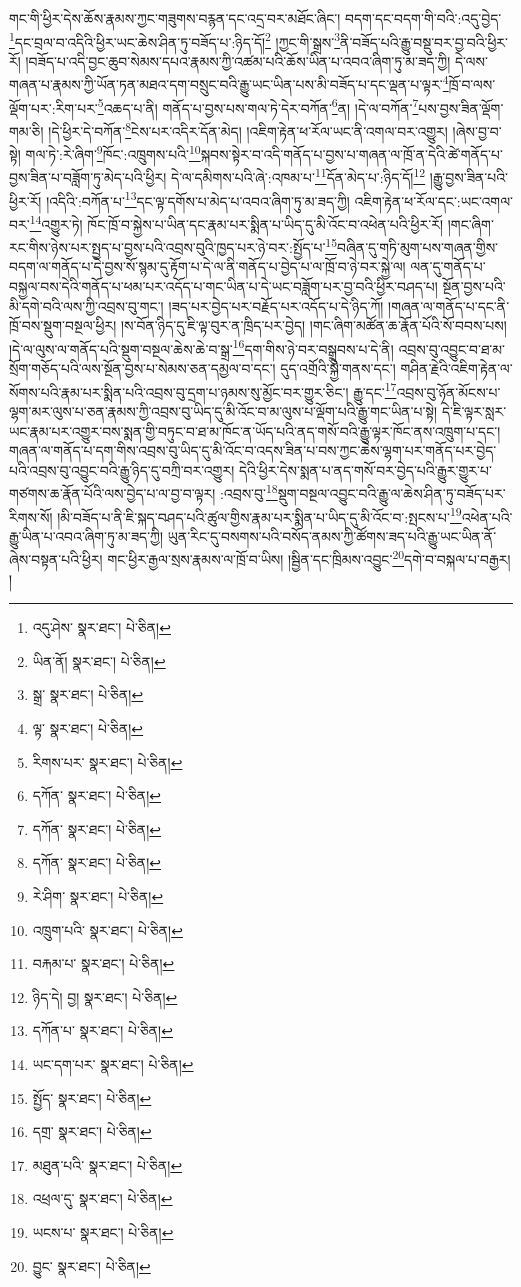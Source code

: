 གང་གི་ཕྱིར་དེས་ཆོས་རྣམས་ཀྱང་གཟུགས་བརྙན་དང་འདྲ་བར་མཐོང་ཞིང་། བདག་དང་བདག་གི་བའི་:འདུ་བྱེད་\footnote{འདུ་ཤེས་  སྣར་ཐང་།  པེ་ཅིན། }དང་བྲལ་བ་འདིའི་ཕྱིར་ཡང་ཆེས་ཤིན་ཏུ་བཟོད་པ་:ཉིད་དོ།\footnote{ཡིན་ནོ།  སྣར་ཐང་།  པེ་ཅིན། } །ཀྱང་གི་སྒྲས་\footnote{སྒྲ་  སྣར་ཐང་།  པེ་ཅིན། }ནི་བཟོད་པའི་རྒྱུ་བསྡུ་བར་བྱ་བའི་ཕྱིར་རོ། །བཟོད་པ་འདི་བྱང་ཆུབ་སེམས་དཔའ་རྣམས་ཀྱི་འཚམ་པའི་ཆོས་ཡིན་པ་འབའ་ཞིག་ཏུ་མ་ཟད་ཀྱི། དེ་ལས་གཞན་པ་རྣམས་ཀྱི་ཡོན་ཏན་མཐའ་དག་བསྲུང་བའི་རྒྱུ་ཡང་ཡིན་པས་མི་བཟོད་པ་དང་ལྡན་པ་ལྟར་\footnote{ལྟ་  སྣར་ཐང་།  པེ་ཅིན། }ཁྲོ་བ་ལས་ལྡོག་པར་:རིག་པར་\footnote{རིགས་པར་  སྣར་ཐང་།  པེ་ཅིན། }འཆད་པ་ནི། གནོད་པ་བྱས་པས་གལ་ཏེ་དེར་བཀོན་\footnote{དཀོན་  སྣར་ཐང་།  པེ་ཅིན། }ན། །དེ་ལ་བཀོན་\footnote{དཀོན་  སྣར་ཐང་།  པེ་ཅིན། }པས་བྱས་ཟིན་ལྡོག་གམ་ཅི། །དེ་ཕྱིར་དེ་བཀོན་\footnote{དཀོན་  སྣར་ཐང་།  པེ་ཅིན། }ངེས་པར་འདིར་དོན་མེད། །འཇིག་རྟེན་ཕ་རོལ་ཡང་ནི་འགལ་བར་འགྱུར། །ཞེས་བྱ་བ་སྟེ། གལ་ཏེ་:རེ་ཞིག་\footnote{རེ་ཤིག་  སྣར་ཐང་།  པེ་ཅིན། }ཁོང་:འཁྲུགས་པའི་\footnote{འཁྲུག་པའི་  སྣར་ཐང་།  པེ་ཅིན། }སྐབས་སྟེར་བ་འདི་གནོད་པ་བྱས་པ་གཞན་ལ་ཁྲོ་ན་དེའི་ཚེ་གནོད་པ་བྱས་ཟིན་པ་བཟློག་ཏུ་མེད་པའི་ཕྱིར། དེ་ལ་དམིགས་པའི་ཞེ་:འཁམ་པ་\footnote{བརྐམ་པ་  སྣར་ཐང་།  པེ་ཅིན། }དོན་མེད་པ་:ཉིད་དོ།\footnote{ཉིད་དེ། བྱ།  སྣར་ཐང་།  པེ་ཅིན། } །རྒྱུ་བྱས་ཟིན་པའི་ཕྱིར་རོ། །འདིའི་:བཀོན་པ་\footnote{དཀོན་པ་  སྣར་ཐང་།  པེ་ཅིན། }དང་ལྟ་དགོས་པ་མེད་པ་འབའ་ཞིག་ཏུ་མ་ཟད་ཀྱི། འཇིག་རྟེན་ཕ་རོལ་དང་:ཡང་འགལ་བར་\footnote{ཡང་དག་པར་  སྣར་ཐང་།  པེ་ཅིན། }འགྱུར་ཏེ། ཁོང་ཁྲོ་བ་སྐྱེས་པ་ཡིན་དང་རྣམ་པར་སྨིན་པ་ཡིད་དུ་མི་འོང་བ་འཕེན་པའི་ཕྱིར་རོ། །གང་ཞིག་རང་གིས་ཉེས་པར་སྤྱད་པ་བྱས་པའི་འབྲས་བུའི་ཁྱད་པར་ཉེ་བར་:སྤྱོད་པ་\footnote{སྤྱོད་  སྣར་ཐང་།  པེ་ཅིན། }བཞིན་དུ་གཏི་མུག་པས་གཞན་གྱིས་བདག་ལ་གནོད་པ་དེ་བྱས་སོ་སྙམ་དུ་རྟོག་པ་དེ་ལ་ནི་གནོད་པ་བྱེད་པ་ལ་ཁྲོ་བ་ཉེ་བར་སྐྱེ་ལ། ལན་དུ་གནོད་པ་བསྐྱལ་བས་དེའི་གནོད་པ་ཕམ་པར་འདོད་པ་གང་ཡིན་པ་དེ་ཡང་བཟློག་པར་བྱ་བའི་ཕྱིར་བཤད་པ། སྔོན་བྱས་པའི་མི་དགེ་བའི་ལས་ཀྱི་འབྲས་བུ་གང་། །ཟད་པར་བྱེད་པར་བརྗོད་པར་འདོད་པ་དེ་ཉིད་ཀོ། །གཞན་ལ་གནོད་པ་དང་ནི་ཁྲོ་བས་སྡུག་བསྔལ་ཕྱིར། །ས་བོན་ཉིད་དུ་ཇི་ལྟ་བུར་ན་ཁྲིད་པར་བྱེད། །གང་ཞིག་མཚོན་ཆ་རྣོན་པོའི་སོ་བབས་པས། །དེ་ལ་ལུས་ལ་གནོད་པའི་སྡུག་བསྔལ་ཆེས་ཆེ་བ་སྒྲ་\footnote{དགྲ་  སྣར་ཐང་།  པེ་ཅིན། }དག་གིས་ཉེ་བར་བསྒྲུབས་པ་དེ་ནི། འབྲས་བུ་འབྱུང་བ་ཐ་མ་སྲོག་གཅོད་པའི་ལས་སྔོན་བྱས་པ་སེམས་ཅན་དམྱལ་བ་དང་། དུད་འགྲོའི་སྐྱེ་གནས་དང་། གཤིན་རྗེའི་འཇིག་རྟེན་ལ་སོགས་པའི་རྣམ་པར་སྨིན་པའི་འབྲས་བུ་དྲག་པ་ཉམས་སུ་མྱོང་བར་གྱུར་ཅིང་། རྒྱུ་དང་\footnote{མཐུན་པའི་  སྣར་ཐང་།  པེ་ཅིན། }འབྲས་བུ་ཉོན་མོངས་པ་ལྷག་མར་ལུས་པ་ཅན་རྣམས་ཀྱི་འབྲས་བུ་ཡིད་དུ་མི་འོང་བ་མ་ལུས་པ་ལྡོག་པའི་རྒྱུ་གང་ཡིན་པ་སྟེ། དེ་ཇི་ལྟར་སླར་ཡང་རྣམ་པར་འགྱུར་བས་སྨན་གྱི་བཏུང་བ་ཐ་མ་ཁོང་ན་ཡོད་པའི་ནད་གསོ་བའི་རྒྱུ་ལྟར་ཁོང་ནས་འཁྲུག་པ་དང་། གཞན་ལ་གནོད་པ་དག་གིས་འབྲས་བུ་ཡིད་དུ་མི་འོང་བ་འདས་ཟིན་པ་བས་ཀྱང་ཆེས་ལྷག་པར་གནོད་པར་བྱེད་པའི་འབྲས་བུ་འབྱུང་བའི་རྒྱུ་ཉིད་དུ་བཀྲི་བར་འགྱུར། དེའི་ཕྱིར་དེས་སྨན་པ་ནད་གསོ་བར་བྱེད་པའི་རྒྱུར་གྱུར་པ་གཙགས་ཆ་རྣོན་པོའི་ལས་བྱེད་པ་ལ་བྱ་བ་ལྟར། :འབྲས་བུ་\footnote{འཕྲལ་དུ་  སྣར་ཐང་།  པེ་ཅིན། }སྡུག་བསྔལ་འབྱུང་བའི་རྒྱུ་ལ་ཆེས་ཤིན་ཏུ་བཟོད་པར་རིགས་སོ། །མི་བཟོད་པ་ནི་ཇི་སྐད་བཤད་པའི་ཚུལ་གྱིས་རྣམ་པར་སྨིན་པ་ཡིད་དུ་མི་འོང་བ་:སྤངས་པ་\footnote{ཡངས་པ་  སྣར་ཐང་།  པེ་ཅིན། }འཕེན་པའི་རྒྱུ་ཡིན་པ་འབའ་ཞིག་ཏུ་མ་ཟད་ཀྱི། ཡུན་རིང་དུ་བསགས་པའི་བསོད་ནམས་ཀྱི་ཚོགས་ཟད་པའི་རྒྱུ་ཡང་ཡིན་ནོ་ཞེས་བསྟན་པའི་ཕྱིར། གང་ཕྱིར་རྒྱལ་སྲས་རྣམས་ལ་ཁྲོ་བ་ཡིས། །སྦྱིན་དང་ཁྲིམས་འབྱུང་\footnote{བྱུང་  སྣར་ཐང་།  པེ་ཅིན། }དགེ་བ་བསྐལ་པ་བརྒྱར། །
